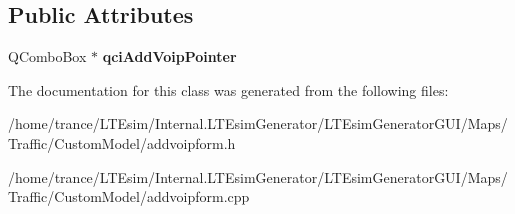 \subsection*{Public Attributes}
\begin{DoxyCompactItemize}
\item 
Q\+Combo\+Box $\ast$ {\bfseries qci\+Add\+Voip\+Pointer}\hypertarget{class_add_voip_form_aa7cf25a54ab44225c209eb96fa6f8299}{}\label{class_add_voip_form_aa7cf25a54ab44225c209eb96fa6f8299}

\end{DoxyCompactItemize}


The documentation for this class was generated from the following files\+:\begin{DoxyCompactItemize}
\item 
/home/trance/\+L\+T\+Esim/\+Internal.\+L\+T\+Esim\+Generator/\+L\+T\+Esim\+Generator\+G\+U\+I/\+Maps/\+Traffic/\+Custom\+Model/addvoipform.\+h\item 
/home/trance/\+L\+T\+Esim/\+Internal.\+L\+T\+Esim\+Generator/\+L\+T\+Esim\+Generator\+G\+U\+I/\+Maps/\+Traffic/\+Custom\+Model/addvoipform.\+cpp\end{DoxyCompactItemize}
